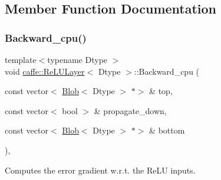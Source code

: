 \subsection{Member Function Documentation}
\mbox{\label{classcaffe_1_1_re_l_u_layer_a4f278f1aca7a380a24b61be5429808a4}} 
\subsubsection{\texorpdfstring{Backward\+\_\+cpu()}{Backward\_cpu()}\hspace{0.1cm}{\footnotesize\ttfamily [1/2]}}
{\footnotesize\ttfamily template$<$typename Dtype $>$ \\
void \mbox{\hyperlink{classcaffe_1_1_re_l_u_layer}{caffe\+::\+Re\+L\+U\+Layer}}$<$ Dtype $>$\+::Backward\+\_\+cpu (\begin{DoxyParamCaption}\item[{const vector$<$ \mbox{\hyperlink{classcaffe_1_1_blob}{Blob}}$<$ Dtype $>$ $\ast$$>$ \&}]{top,  }\item[{const vector$<$ bool $>$ \&}]{propagate\+\_\+down,  }\item[{const vector$<$ \mbox{\hyperlink{classcaffe_1_1_blob}{Blob}}$<$ Dtype $>$ $\ast$$>$ \&}]{bottom }\end{DoxyParamCaption})\hspace{0.3cm}{\ttfamily [protected]}, {\ttfamily [virtual]}}



Computes the error gradient w.\+r.\+t. the Re\+LU inputs. 


